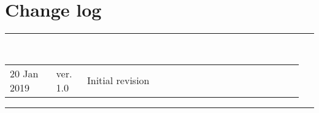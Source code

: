 \section*{\LARGE Change log}%
%
  \rule{\textwidth}{1.0pt}\\[5pt]%
  \begin{tabular}{>{\raggedright}p{0.15\linewidth}p{0.1\linewidth}p{0.7\linewidth}}
  	20 Jan 2019 & ver. 1.0 & Initial revision
  \end{tabular}\newline%
 \rule{\textwidth}{1.0pt}
